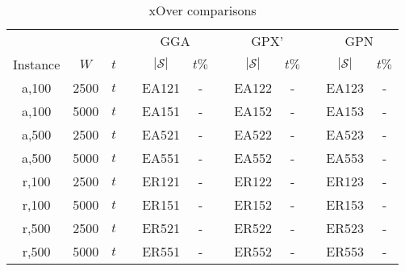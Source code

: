 \documentclass{elsarticle}
\begin{document}
\begin{table}[h!]
	\centering
	\caption{xOver comparisons}
	\begin{tabular}{cccccccccccc}\toprule
		& & & &\multicolumn{2}{c}{GGA} &\phantom{a}& \multicolumn{2}{c}{GPX'} &\phantom{a}& \multicolumn{2}{c}{GPN}\\
		\cmidrule{5-6} \cmidrule{8-9} \cmidrule{11-12}
		Instance & $W$ & $t$ && $|\mathcal{S}|$ & $t\%$ && $|\mathcal{S}|$ & $t\%$ && $|\mathcal{S}|$ & $t\%$ \\ \midrule	
		a,100 & 2500 & $t$ && EA121 & - && EA122 & - && EA123 & -\\
		a,100 & 5000 & $t$ && EA151 & - && EA152 & - && EA153 & -\\
		\midrule
		a,500 & 2500 & $t$ && EA521 & - && EA522 & - && EA523 & -\\
		a,500 & 5000 & $t$ && EA551 & - && EA552 & - && EA553 & -\\
		\midrule
		\midrule
		r,100 & 2500 & $t$ && ER121 & - && ER122 & - && ER123 & -\\
		r,100 & 5000 & $t$ && ER151 & - && ER152 & - && ER153 & -\\
		\midrule
		r,500 & 2500 & $t$ && ER521 & - && ER522 & - && ER523 & -\\
		r,500 & 5000 & $t$ && ER551 & - && ER552 & - && ER553 & -\\
		\bottomrule
	\end{tabular}	
	\label{table:EA}
\end{table}
\end{document}
